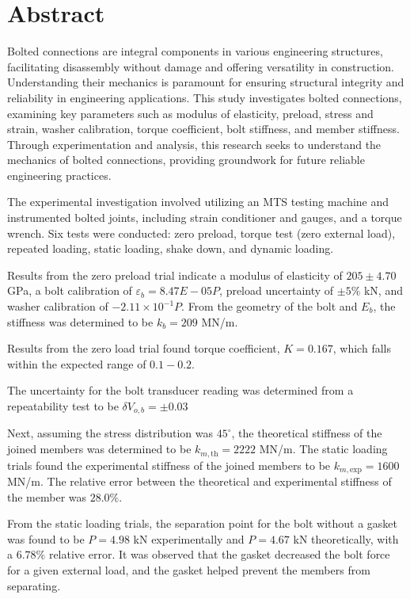\section*{Abstract}
    Bolted connections are integral components in various engineering structures, facilitating disassembly without damage and offering versatility in construction. Understanding their mechanics is paramount for ensuring structural integrity and reliability in engineering applications. This study investigates bolted connections, examining key parameters such as modulus of elasticity, preload, stress and strain, washer calibration, torque coefficient, bolt stiffness, and member stiffness. Through experimentation and analysis, this research seeks to understand the mechanics of bolted connections, providing groundwork for future reliable engineering practices.

    The experimental investigation involved utilizing an MTS testing machine and instrumented bolted joints, including strain conditioner and gauges, and a torque wrench. Six tests were conducted: zero preload, torque test (zero external load), repeated loading, static loading, shake down, and dynamic loading. 

    Results from the zero preload trial indicate a modulus of elasticity of $205 \pm 4.70$ GPa, a bolt calibration of $\varepsilon_{b} = 8.47E-05 P$, preload uncertainty of $\pm 5\%$ kN, and washer calibration of $-2.11 \times 10^{-1}P$. From the geometry of the bolt and $E_b$, the stiffness was determined to be $k_b = 209$ MN/m.
    
    Results from the zero load trial found torque coefficient, $K = 0.167$, which falls within the expected range of $0.1 - 0.2$. 
    
    The uncertainty for the bolt transducer reading was determined from a repeatability test to be $\delta V_{o, b} =\pm 0.03$
    
    Next, assuming the stress distribution was $45^{\circ}$, the theoretical stiffness of the joined members was determined to be $k_{m, \text{th}} = 2222$ MN/m. The static loading trials found the experimental stiffness of the joined members to be $k_{m, \text{exp}} = 1600$ MN/m. The relative error between the theoretical and experimental  stiffness of the member was $28.0\%$. 

    From the static loading trials, the separation point for the bolt without a gasket was found to be $P = 4.98$ kN experimentally and $P = 4.67$ kN theoretically, with a $6.78\%$ relative error. It was observed that the gasket decreased the bolt force for a given external load, and the gasket helped prevent the members from separating.


